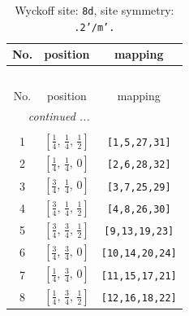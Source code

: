 \documentclass[fleqn,8pt]{jsarticle}
\begin{document}
\begin{longtable}{ccc}
\caption{Wyckoff site: {\tt 8d}, site symmetry: {\tt .2'/m'.}}
 \\
 \hline \hline
No. & position & mapping \\ \hline \endfirsthead

\multicolumn{2}{l}{\tablename\ \thetable{}} \\
 \hline \hline
No. & position & mapping \\ \hline \endhead

 \hline \hline
\multicolumn{2}{r}{\footnotesize\it continued ...} \\ \endfoot

 \hline \hline
\multicolumn{2}{r}{} \\ \endlastfoot

1 & $\left[ \frac{1}{4},\, \frac{1}{4},\, \frac{1}{2} \right]$ & {\tt [1,5,27,31]} \\ \hline
2 & $\left[ \frac{1}{4},\, \frac{1}{4},\, 0 \right]$ & {\tt [2,6,28,32]} \\ \hline
3 & $\left[ \frac{3}{4},\, \frac{1}{4},\, 0 \right]$ & {\tt [3,7,25,29]} \\ \hline
4 & $\left[ \frac{3}{4},\, \frac{1}{4},\, \frac{1}{2} \right]$ & {\tt [4,8,26,30]} \\ \hline
5 & $\left[ \frac{3}{4},\, \frac{3}{4},\, \frac{1}{2} \right]$ & {\tt [9,13,19,23]} \\ \hline
6 & $\left[ \frac{3}{4},\, \frac{3}{4},\, 0 \right]$ & {\tt [10,14,20,24]} \\ \hline
7 & $\left[ \frac{1}{4},\, \frac{3}{4},\, 0 \right]$ & {\tt [11,15,17,21]} \\ \hline
8 & $\left[ \frac{1}{4},\, \frac{3}{4},\, \frac{1}{2} \right]$ & {\tt [12,16,18,22]} \\
\end{longtable}
\renewcommand{\arraystretch}{1.2}
\end{document}
